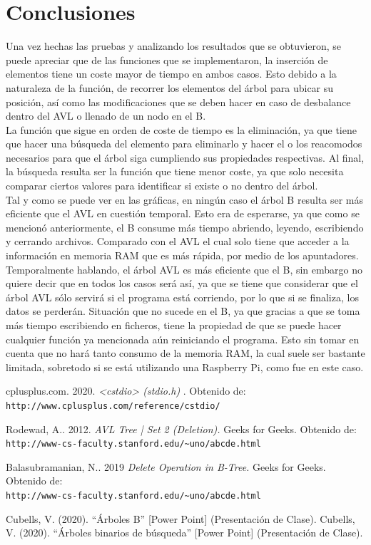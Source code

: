 \documentclass[acmsmall]{acmart}
\begin{document}
\section{Conclusiones}
Una vez hechas las pruebas y analizando los resultados que se obtuvieron, se puede apreciar que de las funciones que se implementaron, la inserción de elementos tiene un coste mayor de tiempo en ambos casos. Esto debido a la naturaleza de la función, de recorrer los elementos del árbol para ubicar su posición, así como las modificaciones que se deben hacer en caso de desbalance dentro del AVL o llenado de un nodo en el B.\\
La función que sigue en orden de coste de tiempo es la eliminación, ya que tiene que hacer una búsqueda del elemento para eliminarlo y hacer el o los reacomodos necesarios para que el árbol siga cumpliendo sus propiedades respectivas.
Al final, la búsqueda resulta ser la función que tiene menor coste, ya que solo necesita comparar ciertos valores para identificar si existe o no dentro del árbol.\\
Tal y como se puede ver en las gráficas, en ningún caso el árbol B resulta ser más eficiente que el AVL en cuestión temporal. Esto era de esperarse, ya que como se mencionó anteriormente, el B consume más tiempo abriendo, leyendo, escribiendo y cerrando archivos. Comparado con el AVL el cual solo tiene que acceder a la información en memoria RAM que es más rápida, por medio de los apuntadores.\\
Temporalmente hablando, el árbol AVL es más eficiente que el B, sin embargo no quiere decir que en todos los casos será así, ya que se tiene que considerar que el árbol AVL sólo servirá si el programa está corriendo, por lo que si se finaliza, los datos se perderán. Situación que no sucede en el B, ya que gracias a que se toma más tiempo escribiendo en ficheros, tiene la propiedad de que se puede hacer cualquier función ya mencionada aún reiniciando el programa. Esto sin tomar en cuenta que no hará tanto consumo de la memoria RAM, la cual suele ser bastante limitada, sobretodo si se está utilizando una Raspberry Pi, como fue en este caso.


\begin{thebibliography}{9}
cplusplus.com. 2020. \textit{<cstdio> (stdio.h) }. Obtenido de:
\texttt{http://www.cplusplus.com/reference/cstdio/}


Rodewad, A.. 2012. \textit{AVL Tree | Set 2 (Deletion).} Geeks for Geeks. Obtenido de:
\\\texttt{http://www-cs-faculty.stanford.edu/\~{}uno/abcde.html}

Balasubramanian, N.. 2019 \textit{Delete Operation in B-Tree.} Geeks for Geeks. Obtenido de:
\\\texttt{http://www-cs-faculty.stanford.edu/\~{}uno/abcde.html}


Cubells, V. (2020). “Árboles B” [Power Point] (Presentación de Clase).
Cubells, V. (2020). “Árboles binarios de búsqueda” [Power Point] (Presentación de Clase).

\end{thebibliography}
\end{document}

